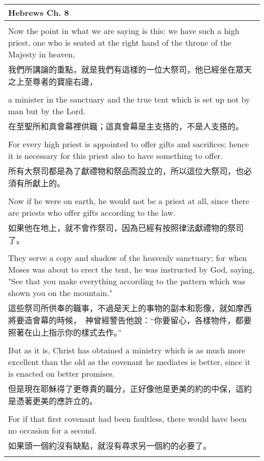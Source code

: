 \documentclass{book}
\begin{document}
\newpage
\begin{tabularx}{\textwidth}{p{}}
\hline
Hebrews Ch. 8 \\
\hline \\
Now the point in what we are saying is this: we have such a high priest, one who is seated at the right hand of the throne of the Majesty in heaven, \\
我們所講論的重點，就是我們有這樣的一位大祭司，他已經坐在眾天之上至尊者的寶座右邊， \\ \\
a minister in the sanctuary and the true tent which is set up not by man but by the Lord. \\
在至聖所和真會幕裡供職；這真會幕是主支搭的，不是人支搭的。 \\ \\
For every high priest is appointed to offer gifts and sacrifices; hence it is necessary for this priest also to have something to offer. \\
所有大祭司都是為了獻禮物和祭品而設立的，所以這位大祭司，也必須有所獻上的。 \\ \\
Now if he were on earth, he would not be a priest at all, since there are priests who offer gifts according to the law. \\
如果他在地上，就不會作祭司，因為已經有按照律法獻禮物的祭司了。 \\ \\
They serve a copy and shadow of the heavenly sanctuary; for when Moses was about to erect the tent, he was instructed by God, saying, "See that you make everything according to the pattern which was shown you on the mountain." \\
這些祭司所供奉的職事，不過是天上的事物的副本和影像，就如摩西將要造會幕的時候，　神曾經警告他說：“你要留心，各樣物件，都要照著在山上指示你的樣式去作。” \\ \\
But as it is, Christ has obtained a ministry which is as much more excellent than the old as the covenant he mediates is better, since it is enacted on better promises. \\
但是現在耶穌得了更尊貴的職分，正好像他是更美的約的中保，這約是憑著更美的應許立的。 \\ \\
For if that first covenant had been faultless, there would have been no occasion for a second. \\
如果頭一個約沒有缺點，就沒有尋求另一個約的必要了。 \\ \\

\end{tabularx}
\end{document}

